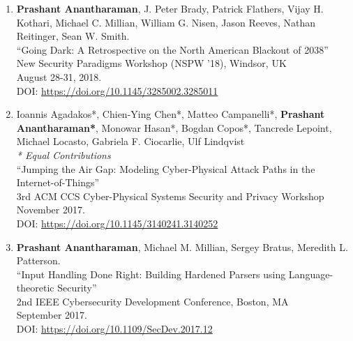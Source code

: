 \documentclass[letterpaper,10pt]{article}
\begin{document}
\begin{enumerate}[label={C\arabic*.}]
\item {\bf Prashant Anantharaman}, J. Peter Brady, Patrick Flathers, Vijay H. Kothari, Michael C. Millian, William G. Nisen, Jason Reeves, Nathan Reitinger, Sean W. Smith.\\
  ``Going Dark: A Retrospective on the North American Blackout of 2038''\\
  New Security Paradigms Workshop (NSPW '18), Windsor, UK\\
  August 28-31, 2018.\\
  DOI: \url{https://doi.org/10.1145/3285002.3285011}

\item Ioannis Agadakos*, Chien-Ying Chen*, Matteo Campanelli*, {\bf Prashant Anantharaman*}, Monowar Hasan*, Bogdan Copos*, Tancrede Lepoint, Michael Locasto, Gabriela F. Ciocarlie, Ulf Lindqvist \\
  \textit{* Equal Contributions}\\
  ``Jumping the Air Gap: Modeling Cyber-Physical Attack Paths in the Internet-of-Things'' \\
  3rd ACM CCS Cyber-Physical Systems Security and Privacy Workshop \\
  November 2017.\\
  DOI: \url{https://doi.org/10.1145/3140241.3140252}
\item {\bf Prashant Anantharaman}, Michael M. Millian, Sergey Bratus, Meredith L. Patterson.\\
  ``Input Handling Done Right: Building Hardened Parsers using Language-theoretic Security''\\
  2nd IEEE Cybersecurity Development Conference, Boston, MA\\
  September 2017.\\
  DOI: \url{https://doi.org/10.1109/SecDev.2017.12}


\end{enumerate}
\end{document}
